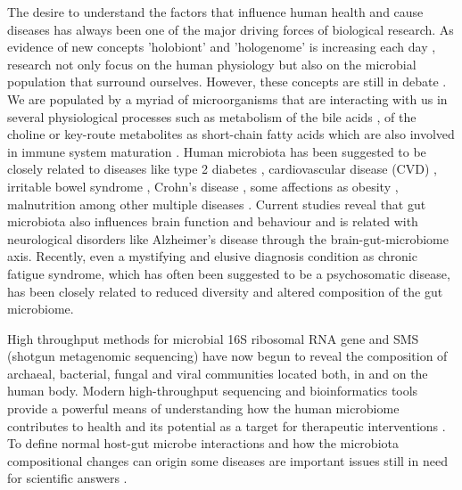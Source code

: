 The desire to understand the factors that influence human health and cause diseases has always been one of the major driving forces of biological research. As evidence of new concepts 'holobiont' and 'hologenome' is increasing each day \cite{holo1, holo2}, research not only focus on the human physiology but also on the microbial population that surround ourselves. However, these concepts are still in debate \cite{holo3}. We are populated by a myriad of microorganisms that are interacting with us in several physiological processes such as metabolism of the bile acids \cite{bileacids}, of the choline \cite{choline} or key-route metabolites as short-chain fatty acids \cite{scfa1, scfa2} which are also involved in immune system maturation \cite{scfa3, scfa4}. Human microbiota has been suggested to be closely related to diseases like type 2 diabetes \cite{diabetes2}, cardiovascular disease (CVD) \cite{CVD}, irritable bowel syndrome \cite{IBS}, Crohn's disease \cite{CD}, some affections as obesity \cite{ob1, ob2}, malnutrition \cite{nutr} among other multiple diseases \cite{Moya_trends}. Current studies reveal that gut microbiota also influences brain function and behaviour and is related with neurological disorders like Alzheimer's disease through the brain-gut-microbiome axis\cite{mind,AD}. Recently, even a mystifying and elusive diagnosis condition as chronic fatigue syndrome, which has often been suggested to be a psychosomatic disease, has been closely related to reduced diversity and altered composition of the gut microbiome\cite{CFS}. 

High throughput methods for microbial 16S ribosomal RNA gene and SMS (shotgun metagenomic sequencing) have now begun to reveal the composition of archaeal, bacterial, fungal and viral communities located both, in and on the human body. Modern high-throughput sequencing and bioinformatics tools provide a powerful means of understanding how the human microbiome contributes to health and its potential as a target for therapeutic interventions \cite{microb&health}. To define normal host-gut microbe interactions and how the microbiota compositional changes can origin some diseases are important issues still in need for scientific answers \cite{normal1, normal2, panthropology}.

